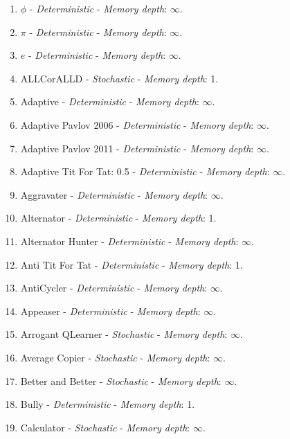 \documentclass[10pt,letterpaper]{article}
\begin{document}
\footnotesize
\begin{enumerate}
\item $\phi$ - \textit{Deterministic} - \textit{Memory depth}: \(\infty\). \cite{axelrodproject}
\item $\pi$ - \textit{Deterministic} - \textit{Memory depth}: \(\infty\). \cite{axelrodproject}
\item $e$ - \textit{Deterministic} - \textit{Memory depth}: \(\infty\). \cite{axelrodproject}
\item ALLCorALLD - \textit{Stochastic} - \textit{Memory depth}: 1. \cite{axelrodproject}
\item Adaptive - \textit{Deterministic} - \textit{Memory depth}: \(\infty\). \cite{Li2011}
\item Adaptive Pavlov 2006 - \textit{Deterministic} - \textit{Memory depth}: \(\infty\). \cite{kendall2007iterated}
\item Adaptive Pavlov 2011 - \textit{Deterministic} - \textit{Memory depth}: \(\infty\). \cite{Li2011}
\item Adaptive Tit For Tat: 0.5 - \textit{Deterministic} - \textit{Memory depth}: \(\infty\). \cite{Tzafestas2000}
\item Aggravater - \textit{Deterministic} - \textit{Memory depth}: \(\infty\). \cite{axelrodproject}
\item Alternator - \textit{Deterministic} - \textit{Memory depth}: 1. \cite{Axelrod1984, Mittal2009}
\item Alternator Hunter - \textit{Deterministic} - \textit{Memory depth}: \(\infty\). \cite{axelrodproject}
\item Anti Tit For Tat - \textit{Deterministic} - \textit{Memory depth}: 1. \cite{Hilbe2013}
\item AntiCycler - \textit{Deterministic} - \textit{Memory depth}: \(\infty\). \cite{axelrodproject}
\item Appeaser - \textit{Deterministic} - \textit{Memory depth}: \(\infty\). \cite{axelrodproject}
\item Arrogant QLearner - \textit{Stochastic} - \textit{Memory depth}: \(\infty\). \cite{axelrodproject}
\item Average Copier - \textit{Stochastic} - \textit{Memory depth}: \(\infty\). \cite{axelrodproject}
\item Better and Better - \textit{Stochastic} - \textit{Memory depth}: \(\infty\). \cite{Prison1998}
\item Bully - \textit{Deterministic} - \textit{Memory depth}: 1. \cite{Nachbar1992}
\item Calculator - \textit{Stochastic} - \textit{Memory depth}: \(\infty\). \cite{Prison1998}

\end{enumerate}
\end{document}
